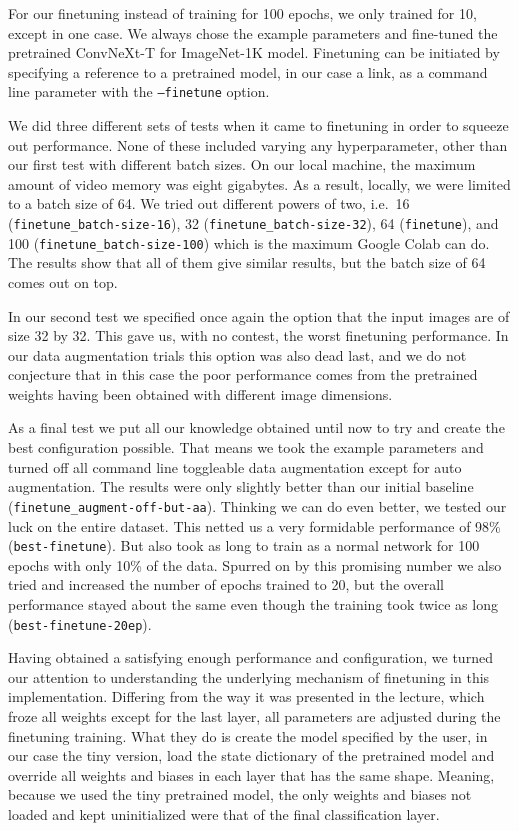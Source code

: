 \documentclass{article}
\begin{document}
For our finetuning instead of training for 100 epochs, we only trained for 10, except in one case.
We always chose the example parameters and fine-tuned the pretrained ConvNeXt-T for ImageNet-1K model\cite{repository}.
Finetuning can be initiated by specifying a reference to a pretrained model, in our case a link, as a command line parameter with the \texttt{--finetune} option.

We did three different sets of tests when it came to finetuning in order to squeeze out performance.
None of these included varying any hyperparameter, other than our first test with different batch sizes.
On our local machine, the maximum amount of video memory was eight gigabytes.
As a result, locally, we were limited to a batch size of 64.
We tried out different powers of two, i.e.\ 16 (\texttt{finetune\_batch-size-16}), 32 (\texttt{finetune\_batch-size-32}), 64 (\texttt{finetune}), and 100 (\texttt{finetune\_batch-size-100}) which is the maximum Google Colab can do.
The results show that all of them give similar results, but the batch size of 64 comes out on top.

In our second test we specified once again the option that the input images are of size 32 by 32.
This gave us, with no contest, the worst finetuning performance.
In our data augmentation trials this option was also dead last, and we do not conjecture that in this case the poor performance comes from the pretrained weights having been obtained with different image dimensions.

As a final test we put all our knowledge obtained until now to try and create the best configuration possible.
That means we took the example parameters and turned off all command line toggleable data augmentation except for auto augmentation.
The results were only slightly better than our initial baseline (\texttt{finetune\_augment-off-but-aa}).
Thinking we can do even better, we tested our luck on the entire dataset.
This netted us a very formidable performance of 98\% (\texttt{best-finetune}).
But also took as long to train as a normal network for 100 epochs with only 10\% of the data.
Spurred on by this promising number we also tried and increased the number of epochs trained to 20, but the overall performance stayed about the same even though the training took twice as long (\texttt{best-finetune-20ep}).

Having obtained a satisfying enough performance and configuration, we turned our attention to understanding the underlying mechanism of finetuning in this implementation.
Differing from the way it was presented in the lecture, which froze all weights except for the last layer, all parameters are adjusted during the finetuning training.
What they do is create the model specified by the user, in our case the tiny version, load the state dictionary of the pretrained model and override all weights and biases in each layer that has the same shape.
Meaning, because we used the tiny pretrained model, the only weights and biases not loaded and kept uninitialized were that of the final classification layer.
\end{document}
